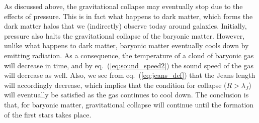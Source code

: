 As discussed above, the gravitational collapse may eventually stop due to the effects of pressure. This is in fact what happens to dark matter, which forms the dark matter halos that we (indirectly) observe today around galaxies. Initially, pressure also halts the gravitational collapse of the baryonic matter. However, unlike what happens to dark matter, baryonic matter eventually cools down by emitting radiation. As a consequence, the temperature of a cloud of baryonic gas will decrease in time, and by eq.\ (\ref{eq:sound_speed2}) the sound speed of the gas will decrease as well. Also, we see from eq.\ (\ref{eq:jeans_def}) that the Jeans length will accordingly decrease, which implies that the condition for collapse ($R>\lambda_J$) will eventually be satisfied as the gas continues to cool down. The conclusion is that, for baryonic matter, gravitational collapse will continue until the formation of the first stars takes place.